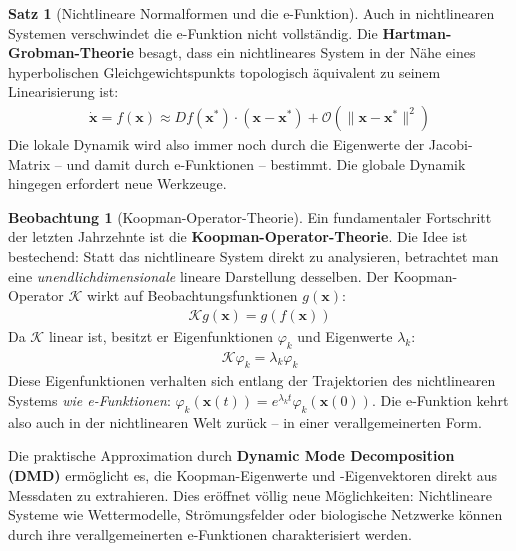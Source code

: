 ﻿\documentclass[a4paper,12pt]{report}
\theoremstyle{definition}
\newtheorem{satz}{Satz}
\newtheorem{beobachtung}{Beobachtung}
\begin{document}
	\begin{satz}[Nichtlineare Normalformen und die e-Funktion]
		Auch in nichtlinearen Systemen verschwindet die e-Funktion nicht vollständig. Die \textbf{Hartman-Grobman-Theorie} besagt, dass ein nichtlineares System in der Nähe eines hyperbolischen Gleichgewichtspunkts topologisch äquivalent zu seinem Linearisierung ist:
		\begin{align}
			\dot{\mathbf{x}} = f(\mathbf{x}) \approx Df(\mathbf{x}^*) \cdot (\mathbf{x} - \mathbf{x}^*) + \mathcal{O}(\|\mathbf{x} - \mathbf{x}^*\|^2)
		\end{align}
		Die lokale Dynamik wird also immer noch durch die Eigenwerte der Jacobi-Matrix -- und damit durch e-Funktionen -- bestimmt. Die globale Dynamik hingegen erfordert neue Werkzeuge.
	\end{satz}
	
	\begin{beobachtung}[Koopman-Operator-Theorie]
		Ein fundamentaler Fortschritt der letzten Jahrzehnte ist die \textbf{Koopman-Operator-Theorie}. Die Idee ist bestechend: Statt das nichtlineare System direkt zu analysieren, betrachtet man eine \emph{unendlichdimensionale} lineare Darstellung desselben. Der Koopman-Operator $\mathcal{K}$ wirkt auf Beobachtungsfunktionen $g(\mathbf{x})$:
		\begin{align}
			\mathcal{K} g(\mathbf{x}) = g(f(\mathbf{x}))
		\end{align}
		Da $\mathcal{K}$ linear ist, besitzt er Eigenfunktionen $\varphi_k$ und Eigenwerte $\lambda_k$:
		\begin{align}
			\mathcal{K} \varphi_k = \lambda_k \varphi_k
		\end{align}
		Diese Eigenfunktionen verhalten sich entlang der Trajektorien des nichtlinearen Systems \emph{wie e-Funktionen}: $\varphi_k(\mathbf{x}(t)) = e^{\lambda_k t} \varphi_k(\mathbf{x}(0))$. Die e-Funktion kehrt also auch in der nichtlinearen Welt zurück -- in einer verallgemeinerten Form.
		
		Die praktische Approximation durch \textbf{Dynamic Mode Decomposition (DMD)} ermöglicht es, die Koopman-Eigenwerte und -Eigenvektoren direkt aus Messdaten zu extrahieren. Dies eröffnet völlig neue Möglichkeiten: Nichtlineare Systeme wie Wettermodelle, Strömungsfelder oder biologische Netzwerke können durch ihre verallgemeinerten e-Funktionen charakterisiert werden.
	\end{beobachtung}
	
\end{document}

